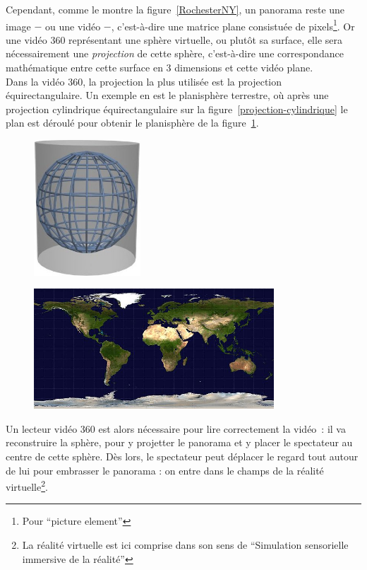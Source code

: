 Cependant, comme le montre la figure~\ref{RochesterNY}, un panorama reste une image
$-$ ou une vidéo $-$, c'est-à-dire une matrice plane consistuée de pixels\footnote{Pour
 \enquote{picture element}}. Or une vidéo 360 représentant une sphère virtuelle, ou
plutôt sa surface, elle sera nécessairement une \emph{projection} de cette sphère, 
c'est-à-dire une correspondance mathématique entre cette surface en 3 dimensions 
et cette vidéo plane\cite{projection-cartographique}.\\
Dans la vidéo 360, la projection la plus utilisée est la projection équirectangulaire\cite{what-is-equirectangular}.
Un exemple en est le planisphère terrestre, où après une projection cylindrique équirectangulaire
sur la figure~\ref{projection-cylindrique} le plan est déroulé pour obtenir le 
planisphère de la figure~\ref{planisphère}.
\begin{figure}
  \centering
  \begin{minipage}{0.4\textwidth}
    \centering
    \includegraphics[width=4cm]{images/Projection-cylindrique.jpg}
    \label{projection-cylindrique}
  \end{minipage}%
  \begin{minipage}{0.6\textwidth}
    \centering
    \includegraphics[width=9cm]{images/Equirectangular-projection.jpg}
    \label{planisphère}
  \end{minipage}
\end{figure}
\newline
Un lecteur vidéo 360 est alors nécessaire pour lire correctement la vidéo~: 
il va reconstruire la sphère, pour y projetter le panorama et y placer le
spectateur au centre de cette sphère. Dès lors, le spectateur peut déplacer le 
regard tout autour de lui pour embrasser le panorama : on entre dans le champs de 
la réalité virtuelle\footnote{La réalité virtuelle est ici comprise dans son sens
  de \enquote{Simulation sensorielle immersive de la réalité}\cite{definition-rv}}.

